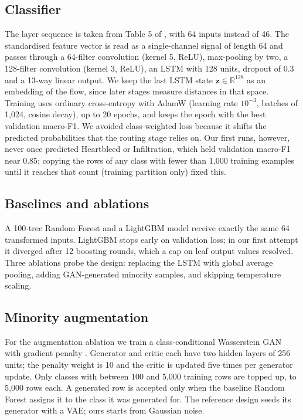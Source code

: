 \documentclass[conference]{IEEEtran}
\begin{document}
\subsection{Classifier}
The layer sequence is taken from Table 5 of \cite{refpaper2025}, with 64 inputs instead of 46.
The standardised feature vector is read as a single-channel signal of length 64 and passes through
a 64-filter convolution (kernel 5, ReLU), max-pooling by two, a 128-filter convolution (kernel 3,
ReLU), an LSTM with 128 units, dropout of 0.3 and a 13-way linear output. We keep the last LSTM
state $\mathbf{z}\in\mathbb{R}^{128}$ as an embedding of the flow, since later stages measure
distances in that space. Training uses ordinary cross-entropy with AdamW (learning rate
$10^{-3}$, batches of 1,024, cosine decay), up to 20 epochs, and keeps the epoch with the best
validation macro-F1. We avoided class-weighted loss because it shifts the predicted probabilities
that the routing stage relies on. Our first runs, however, never once predicted Heartbleed or
Infiltration, which held validation macro-F1 near 0.85; copying the rows of any class with fewer
than 1,000 training examples until it reaches that count (training partition only) fixed this.

\subsection{Baselines and ablations}
A 100-tree Random Forest and a LightGBM model receive exactly the same 64 transformed inputs.
LightGBM stops early on validation loss; in our first attempt it diverged after 12 boosting
rounds, which a cap on leaf output values resolved. Three ablations probe the design: replacing
the LSTM with global average pooling, adding GAN-generated minority samples, and skipping
temperature scaling.

\subsection{Minority augmentation}
For the augmentation ablation we train a class-conditional Wasserstein GAN with gradient penalty
\cite{mirza2014conditional,gulrajani2017improved}. Generator and critic each have two hidden layers
of 256 units; the penalty weight is 10 and the critic is updated five times per generator update.
Only classes with between 100 and 5,000 training rows are topped up, to 5,000 rows each. A
generated row is accepted only when the baseline Random Forest assigns it to the class it was
generated for. The reference design seeds its generator with a VAE; ours starts from Gaussian
noise.
\end{document}
